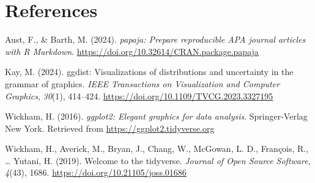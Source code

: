 \documentclass[
  man]{apa6}
\newlength{\cslhangindent}
\newenvironment{CSLReferences}[2] %
 {\begin{list}{}{%
  \setlength{\itemindent}{0pt}
  \setlength{\leftmargin}{0pt}
  \setlength{\parsep}{0pt}
  \ifodd #1
   \setlength{\leftmargin}{\cslhangindent}
   \setlength{\itemindent}{-1\cslhangindent}
  \fi
  \setlength{\itemsep}{#2\baselineskip}}}
 {\end{list}}
\begin{document}
\newpage

\section*{References}\label{references}

\label{refs}
\begin{CSLReferences}{1}{0}
Aust, F., \& Barth, M. (2024). \emph{{papaja}: {Prepare} reproducible {APA} journal articles with {R Markdown}}. \url{https://doi.org/10.32614/CRAN.package.papaja}

Kay, M. (2024). {ggdist}: Visualizations of distributions and uncertainty in the grammar of graphics. \emph{IEEE Transactions on Visualization and Computer Graphics}, \emph{30}(1), 414--424. \url{https://doi.org/10.1109/TVCG.2023.3327195}

Wickham, H. (2016). \emph{ggplot2: Elegant graphics for data analysis}. Springer-Verlag New York. Retrieved from \url{https://ggplot2.tidyverse.org}

Wickham, H., Averick, M., Bryan, J., Chang, W., McGowan, L. D., François, R., \ldots{} Yutani, H. (2019). Welcome to the {tidyverse}. \emph{Journal of Open Source Software}, \emph{4}(43), 1686. \url{https://doi.org/10.21105/joss.01686}

\end{CSLReferences}
\end{document}
